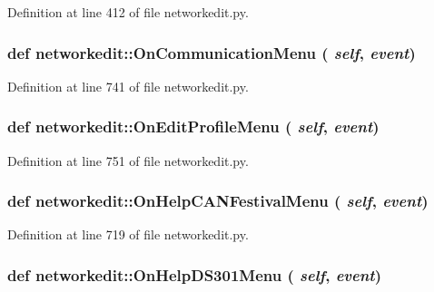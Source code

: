 Definition at line 412 of file networkedit.py.\hypertarget{namespacenetworkedit_85896082081260d8321487b78afeb70e}{
\subsubsection[OnCommunicationMenu]{\setlength{\rightskip}{0pt plus 5cm}def networkedit::On\-Communication\-Menu ( {\em self},  {\em event})}}
\label{namespacenetworkedit_85896082081260d8321487b78afeb70e}




Definition at line 741 of file networkedit.py.\hypertarget{namespacenetworkedit_36f6066b7c1cdd9298d4e49c8e3aae04}{
\subsubsection[OnEditProfileMenu]{\setlength{\rightskip}{0pt plus 5cm}def networkedit::On\-Edit\-Profile\-Menu ( {\em self},  {\em event})}}
\label{namespacenetworkedit_36f6066b7c1cdd9298d4e49c8e3aae04}




Definition at line 751 of file networkedit.py.\hypertarget{namespacenetworkedit_93a70d630ce5859be11aef8d8d946422}{
\subsubsection[OnHelpCANFestivalMenu]{\setlength{\rightskip}{0pt plus 5cm}def networkedit::On\-Help\-CANFestival\-Menu ( {\em self},  {\em event})}}
\label{namespacenetworkedit_93a70d630ce5859be11aef8d8d946422}




Definition at line 719 of file networkedit.py.\hypertarget{namespacenetworkedit_a41a7f8c80dcf62ea786deda026be61e}{
\subsubsection[OnHelpDS301Menu]{\setlength{\rightskip}{0pt plus 5cm}def networkedit::On\-Help\-DS301Menu ( {\em self},  {\em event})}}
\label{namespacenetworkedit_a41a7f8c80dcf62ea786deda026be61e}




